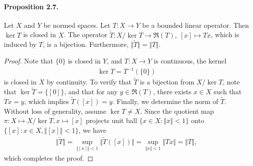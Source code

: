 \documentclass{article}
\begin{document}
\paragraph{Proposition 2.7.\label{prop:2.7}} Let $X$ and $Y$ be normed spaces. Let $T:X\to Y$ be a bounded linear operator. Then $\ker T$ is closed in $X$. The operator $\tilde{T}:X/\ker T\to\mathfrak{R}(T),\ [x]\mapsto Tx$, which is induced by $T$, is a bijection. Furthermore, $\Vert\tilde{T}\Vert = \Vert T\Vert$.
\begin{proof}
Note that $\{0\}$ is closed in $Y$, and $T:X\to Y$ is continuous, the kernel
\begin{align*}
	\ker T = T^{-1}(\{0\})
\end{align*}
is closed in $X$ by continuity. To verify that $\tilde{T}$ is a bijection from $X/\ker T$, note that $\ker\tilde{T} = \{[0]\}$, and that for any $y\in\mathfrak{R}(T)$, there exists $x\in X$ such that $Tx=y$, which implies $\tilde{T}([x]) = y$. Finally, we determine the norm of $\tilde{T}$. Without loss of generality, assume $\ker T\neq X$. Since the quotient map $\pi:X\mapsto X/\ker T,x\mapsto [x]$ projects unit ball $\{x\in X:\Vert x\Vert < 1\}$ onto $\{[x]:x\in X,\Vert[x]\Vert<1\}$, we have
\begin{align*}
	\Vert\tilde{T}\Vert = \sup_{\Vert [x]\Vert < 1}\Vert\tilde{T}([x])\Vert = \sup_{\Vert x\Vert < 1}\Vert Tx\Vert = \Vert T\Vert,
\end{align*}
which completes the proof.
\end{proof}
\end{document}
